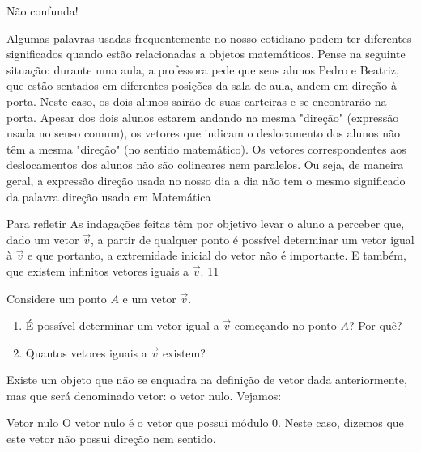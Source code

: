 \begin{observationtitle}{Não confunda!}

Algumas palavras usadas frequentemente no nosso cotidiano podem ter diferentes significados quando estão relacionadas a objetos matemáticos. Pense na seguinte situação: durante uma aula, a professora pede que seus alunos Pedro e Beatriz, que estão sentados em diferentes posições da sala de aula, andem em direção à porta. Neste caso, os dois alunos sairão de suas carteiras e se encontrarão na porta. Apesar dos dois alunos estarem andando na mesma "direção"{} (expressão usada no senso comum), os vetores que indicam o deslocamento dos alunos não têm a mesma "direção"{} (no sentido matemático). Os vetores correspondentes aos deslocamentos dos alunos não são colineares nem paralelos. Ou seja, de maneira geral, a expressão direção usada no nosso dia a dia não tem o mesmo significado da palavra direção usada em Matemática
\end{observationtitle}
\marginpar{\vspace{5em}}
\begin{objectives}{Para refletir}
{
As indagações feitas têm por objetivo levar o aluno a perceber que, dado um vetor \(\vec{v}\), a partir de qualquer ponto é possível determinar um vetor igual à \(\vec{v}\) e que portanto, a extremidade inicial do vetor não é importante. E também, que existem infinitos vetores iguais a \(\vec{v}\).}
{1}{1}
\end{objectives}
\begin{reflection}

Considere um ponto \(A\) e um vetor \(\vec{v}\).
\begin{enumerate}
\item {} 
É possível determinar um vetor igual a \(\vec{v}\) começando no ponto \(A\)? Por quê?

\item {} 
Quantos vetores iguais a \(\vec{v}\) existem?

\end{enumerate}
\end{reflection}



Existe um objeto que não se enquadra na definição de vetor dada anteriormente, mas que será denominado vetor: o vetor nulo. Vejamos:
\begin{observationtitle}{Vetor nulo}
O vetor nulo é o vetor que possui módulo 0. Neste caso, dizemos que este vetor não possui direção nem sentido.
\end{observationtitle}


